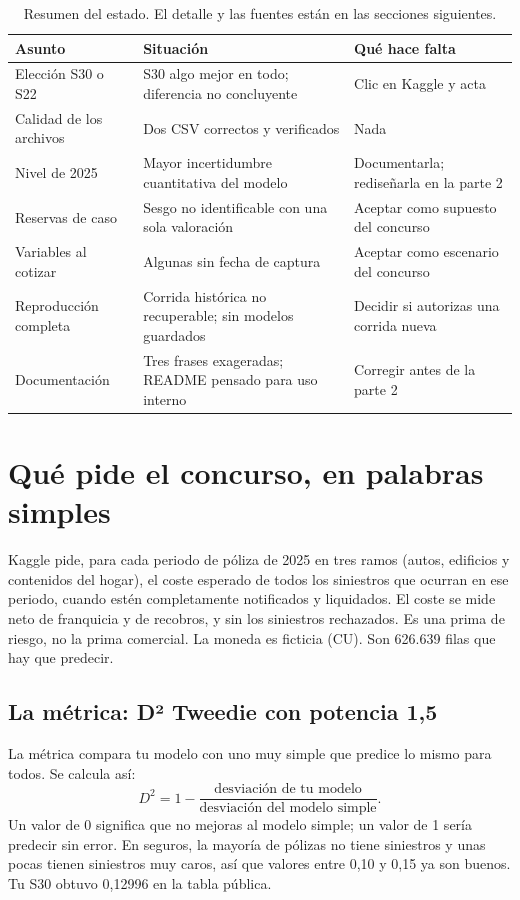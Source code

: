 \documentclass[11pt,a4paper]{article}
\begin{document}
\begin{table}[H]
\centering\small
\begin{tabularx}{\linewidth}{@{}P{3.6cm}LL@{}}
\toprule
Asunto & Situación & Qué hace falta \\
\midrule
Elección S30 o S22 & S30 algo mejor en todo; diferencia no concluyente & Clic en Kaggle y acta \\
Calidad de los archivos & Dos CSV correctos y verificados & Nada \\
Nivel de 2025 & Mayor incertidumbre cuantitativa del modelo & Documentarla; rediseñarla en la parte 2 \\
Reservas de caso & Sesgo no identificable con una sola valoración & Aceptar como supuesto del concurso \\
Variables al cotizar & Algunas sin fecha de captura & Aceptar como escenario del concurso \\
Reproducción completa & Corrida histórica no recuperable; sin modelos guardados & Decidir si autorizas una corrida nueva \\
Documentación & Tres frases exageradas; README pensado para uso interno & Corregir antes de la parte 2 \\
\bottomrule
\end{tabularx}
\caption{Resumen del estado. El detalle y las fuentes están en las secciones siguientes.}
\end{table}

\section{Qué pide el concurso, en palabras simples}

Kaggle pide, para cada periodo de póliza de 2025 en tres ramos (autos, edificios y contenidos del hogar), el coste esperado de todos los siniestros que ocurran en ese periodo, cuando estén completamente notificados y liquidados. El coste se mide neto de franquicia y de recobros, y sin los siniestros rechazados. Es una prima de riesgo, no la prima comercial. La moneda es ficticia (CU). Son 626.639 filas que hay que predecir.

\subsection{La métrica: D² Tweedie con potencia 1,5}

La métrica compara tu modelo con uno muy simple que predice lo mismo para todos. Se calcula así:
\[
D^2 = 1 - \frac{\text{desviación de tu modelo}}{\text{desviación del modelo simple}}.
\]
Un valor de 0 significa que no mejoras al modelo simple; un valor de 1 sería predecir sin error. En seguros, la mayoría de pólizas no tiene siniestros y unas pocas tienen siniestros muy caros, así que valores entre 0,10 y 0,15 ya son buenos. Tu S30 obtuvo 0,12996 en la tabla pública.
\end{document}
